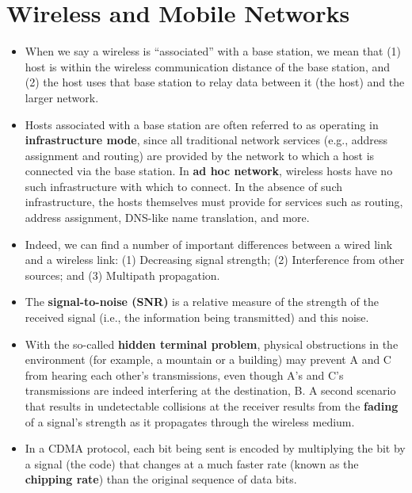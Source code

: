 \section{Wireless and Mobile Networks}
\begin{itemize}

\item
When we say a wireless is ``associated'' with a base station, we mean that (1) host is within the wireless communication distance of the base station, and (2) the host uses that base station to relay data between it (the host) and the larger network.

\item
Hosts associated with a base station are often referred to as operating in \textbf{infrastructure mode}, since all traditional network services (e.g., address assignment and routing) are provided by the network to which a host is connected via the base station. In \textbf{ad hoc network}, wireless hosts have no such infrastructure with which to connect. In the absence of such infrastructure, the hosts themselves must provide for services such as routing, address assignment, DNS-like name translation, and more.

\item
Indeed, we can find a number of important differences between a wired link and a wireless link: (1) Decreasing signal strength; (2) Interference from other sources; and (3) Multipath propagation.

\item
The \textbf{signal-to-noise (SNR)} is a relative measure of the strength of the received signal (i.e., the information being transmitted) and this noise.

\item
With the so-called \textbf{hidden terminal problem}, physical obstructions in the environment (for example, a mountain or a building) may prevent A and C from hearing each other's transmissions, even though A's and C's transmissions are indeed interfering at the destination, B. A second scenario that results in undetectable collisions at the receiver results from  the \textbf{fading} of a signal's strength as it propagates through the wireless medium.

\item
In a CDMA protocol, each bit being sent is encoded by multiplying the bit by a signal (the code) that changes at a much faster rate (known as the \textbf{chipping rate}) than the original sequence of data bits.


\end{itemize}
